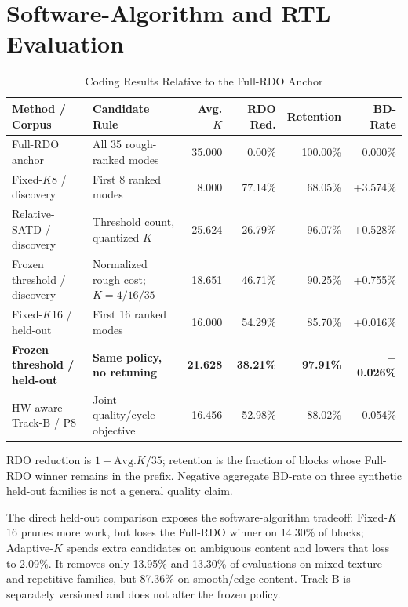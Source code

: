 \documentclass[journal]{IEEEtran}
\begin{document}
\section{Software-Algorithm and RTL Evaluation}
\begin{table}[!t]
\caption{Coding Results Relative to the Full-RDO Anchor}
\label{tab:coding}
\centering
\footnotesize
\setlength{\tabcolsep}{3.5pt}
\begin{tabularx}{\textwidth}{@{}>{\raggedright\arraybackslash}p{}
  >{\raggedright\arraybackslash}X r r r r@{}}
\toprule
\textbf{Method / Corpus} & \textbf{Candidate Rule} & \textbf{Avg. $K$} &
\textbf{RDO Red.} & \textbf{Retention} & \textbf{BD-Rate} \\
\midrule
Full-RDO anchor & All 35 rough-ranked modes & 35.000 & 0.00\% & 100.00\% & 0.000\% \\
Fixed-$K$8 / discovery & First 8 ranked modes & 8.000 & 77.14\% & 68.05\% & +3.574\% \\
Relative-SATD / discovery & Threshold count, quantized $K$ & 25.624 & 26.79\% & 96.07\% & +0.528\% \\
Frozen threshold / discovery & Normalized rough cost; $K=4/16/35$ & 18.651 & 46.71\% & 90.25\% & +0.755\% \\
Fixed-$K$16 / held-out & First 16 ranked modes & 16.000 & 54.29\% & 85.70\% & +0.016\% \\
\textbf{Frozen threshold / held-out} & \textbf{Same policy, no retuning} &
\textbf{21.628} & \textbf{38.21\%} & \textbf{97.91\%} & \textbf{$-$0.026\%} \\
HW-aware Track-B / P8 & Joint quality/cycle objective & 16.456 & 52.98\% & 88.02\% & $-$0.054\% \\
\bottomrule
\end{tabularx}
\par\vspace{2pt}
\footnotesize RDO reduction is $1-\mathrm{Avg.}K/35$; retention is the fraction
of blocks whose Full-RDO winner remains in the prefix. Negative aggregate
BD-rate on three synthetic held-out families is not a general quality claim.
\end{table}

The direct held-out comparison exposes the software-algorithm tradeoff:
Fixed-$K$16 prunes more work, but loses the Full-RDO winner on 14.30\% of
blocks; Adaptive-$K$ spends extra candidates on ambiguous content and lowers
that loss to 2.09\%. It removes only 13.95\% and 13.30\% of evaluations on
mixed-texture and repetitive families, but 87.36\% on smooth/edge content.
Track-B is separately versioned and does not alter the frozen policy.
\end{document}
